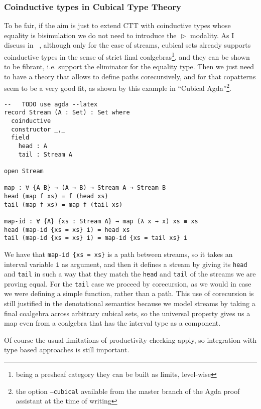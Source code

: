 \documentclass{book}
\DeclareMathOperator{\Later}{\vartriangleright}
\begin{document}
  \subsubsection{Coinductive types in Cubical Type Theory}
  To be fair, if the aim is just to extend CTT with coinductive types
  whose equality is bisimulation we do not need to introduce the
  $\Later$ modality. As I discuss in~\cite{vezzosi:streams17}
  , although only for the case of streams, cubical sets
  already supports coinductive types in the sense of strict final
  coalgebras\footnote{being a presheaf category they can be built as
    limits, level-wise}, and they can be shown to be fibrant,
  i.e. support the eliminator for the equality type.  Then we just
  need to have a theory that allows to define paths corecursively, and
  for that copatterns seem to be a very good fit, as shown by this
  example in ``Cubical Agda''\footnote{the option \texttt{--cubical} available from the master branch of the Agda proof assistant at the time of writing}.
\begin{verbatim}
--   TODO use agda --latex
record Stream (A : Set) : Set where
  coinductive
  constructor _,_
  field
    head : A
    tail : Stream A

open Stream

map : ∀ {A B} → (A → B) → Stream A → Stream B
head (map f xs) = f (head xs)
tail (map f xs) = map f (tail xs)

map-id : ∀ {A} {xs : Stream A} → map (λ x → x) xs ≡ xs
head (map-id {xs = xs} i) = head xs
tail (map-id {xs = xs} i) = map-id {xs = tail xs} i
\end{verbatim}
  We have that \verb|map-id {xs = xs}| is a path between streams, so it
  takes an interval variable \verb|i| as argument, and then it defines a
  stream by giving its \verb|head| and \verb|tail| in such a way that they match
  the \verb|head| and \verb|tail| of the streams we are proving equal.  For the
  \verb|tail| case we proceed by corecursion, as we would in case we were
  defining a simple function, rather than a path.  This use of
  corecursion is still justified in the denotational semantics because
  we model streams by taking a final coalgebra across arbitrary
  cubical sets, so the universal property gives us a map even from a coalgebra that
  has the interval type as a component.

  Of course the usual limitations of productivity checking apply, so
  integration with type based approaches is still important.

\end{document}
